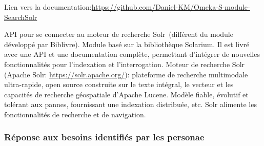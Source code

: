 Lien vers la documentation:\url{https://github.com/Daniel-KM/Omeka-S-module-SearchSolr}
 
API pour se connecter au moteur de recherche Solr (différent du module développé par Biblivre).
Module basé sur la bibliothèque Solarium. Il est livré avec une API et une documentation complète, permettant d’intégrer de nouvelles fonctionnalités pour l’indexation et l’interrogation. 
Moteur de recherche Solr (Apache Solr: \url{https://solr.apache.org/}): plateforme de recherche multimodale ultra-rapide, open source construite sur le texte intégral, le vecteur et les capacités de recherche géospatiale d’Apache Lucene. Modèle fiable, évolutif et tolérant aux pannes, fournissant une indexation distribuée, etc. Solr alimente les fonctionnalités de recherche et de navigation.

\subsubsection{Réponse aux besoins identifiés par les personae}

